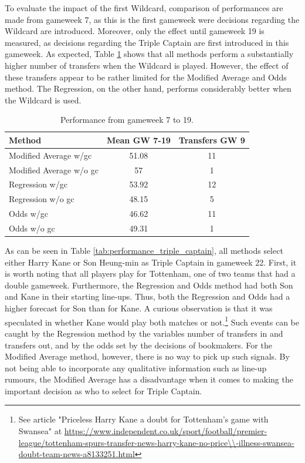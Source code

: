 To evaluate the impact of the first Wildcard,  comparison of performances are made from gameweek 7, as this is the first gameweek were decisions regarding the Wildcard are introduced. Moreover, only the effect until gameweek 19 is measured, as decisions regarding the Triple Captain are first introduced in this gameweek. As expected, Table \ref{tab:first_wildcard} shows that all methods perform a substantially higher number of transfers when the Wildcard is played. However, the effect of these transfers appear to be rather limited for the Modified Average and Odds method. The Regression, on the other hand, performs considerably better when the Wildcard is used.  

\newpar




\begin{table}[H]
\centering
\begin{tabular}{@{}lcc@{}}
\toprule
                Method  & Mean GW 7-19  & Transfers GW 9 \\ \midrule
Modified Average w/gc   & 51.08 & 11             \\
Modified Average w/o gc & 57    & 1              \\
Regression w/gc         & 53.92 & 12             \\
Regression w/o gc       & 48.15 & 5              \\
Odds w/gc               & 46.62 & 11             \\
Odds w/o gc             & 49.31 & 1              \\ \bottomrule
\end{tabular}
\caption{Performance from gameweek 7 to 19.}
\label{tab:first_wildcard}
\end{table}


As can be seen in Table \ref{tab:performance_triple_captain}, all methods select either Harry Kane or Son Heung-min as Triple Captain in gameweek 22. First, it is worth noting that all players play for Tottenham, one of two teams that had a double gameweek. Furthermore, the Regression and Odds method had both Son and Kane in their starting line-ups. Thus, both the Regression and Odds had a higher forecast for Son than for Kane. A curious observation is that it was speculated in whether Kane would play both matches or not.\footnote{See article "Priceless Harry Kane a doubt for Tottenham's game with Swansea" at \newline \url{https://www.independent.co.uk/sport/football/premier-league/tottenham-spurs-transfer-news-harry-kane-no-price\\-illness-swansea-doubt-team-news-a8133251.html}} Such events can be caught by the Regression method by the variables number of transfers in and transfers out, and by the odds set by the decisions of bookmakers. For the Modified Average method, however, there is no way to pick up such signals. By not being able to incorporate any qualitative information such as line-up rumours, the Modified Average has a disadvantage when it comes to making the important decision as who to select for Triple Captain.


